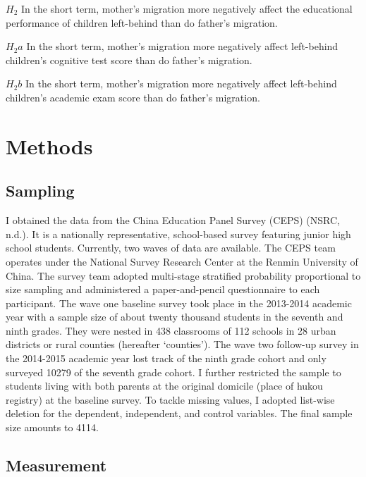 \documentclass[
  man,floatsintext]{apa7}
\begin{document}
\(H_2\) In the short term, mother's migration more negatively affect the educational performance of children left-behind than do father's migration.

\(H_2a\) In the short term, mother's migration more negatively affect left-behind children's cognitive test score than do father's migration.

\(H_2b\) In the short term, mother's migration more negatively affect left-behind children's academic exam score than do father's migration.

\newpage

\hypertarget{methods}{%
\section{Methods}\label{methods}}

\hypertarget{sampling}{%
\subsection{Sampling}\label{sampling}}

I obtained the data from the China Education Panel Survey (CEPS) (NSRC, n.d.). It is a nationally representative, school-based survey featuring junior high school students. Currently, two waves of data are available. The CEPS team operates under the National Survey Research Center at the Renmin University of China. The survey team adopted multi-stage stratified probability proportional to size sampling and administered a paper-and-pencil questionnaire to each participant. The wave one baseline survey took place in the 2013-2014 academic year with a sample size of about twenty thousand students in the seventh and ninth grades. They were nested in 438 classrooms of 112 schools in 28 urban districts or rural counties (hereafter `counties'). The wave two follow-up survey in the 2014-2015 academic year lost track of the ninth grade cohort and only surveyed 10279 of the seventh grade cohort. I further restricted the sample to students living with both parents at the original domicile (place of hukou registry) at the baseline survey. To tackle missing values, I adopted list-wise deletion for the dependent, independent, and control variables. The final sample size amounts to 4114.

\hypertarget{measurement}{%
\subsection{Measurement}\label{measurement}}
\end{document}
